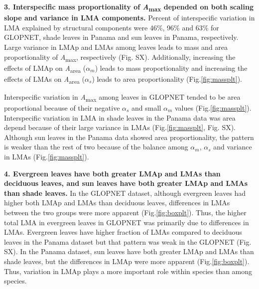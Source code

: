 \documentclass[
  12pt,
]{article}
\providecommand{\DIFaddtex}[1]{{\protect\color{blue}\uwave{#1}}} %
\providecommand{\DIFdeltex}[1]{{\protect\color{red}\sout{#1}}}                      %
\providecommand{\DIFaddbegin}{} %
\providecommand{\DIFaddend}{} %
\providecommand{\DIFdelbegin}{} %
\providecommand{\DIFdelend}{} %
\providecommand{\DIFadd}[1]{\texorpdfstring{\DIFaddtex{#1}}{#1}} %
\providecommand{\DIFdel}[1]{\texorpdfstring{\DIFdeltex{#1}}{}} %
\newcommand{\DIFscaledelfig}{0.5}
\newlength{\DIFdelgraphicswidth} %
\newlength{\DIFdelgraphicsheight} %
\newcommand{\DIFaddincludegraphics}[2][]{{\color{blue}\fbox{\DIFOincludegraphics[#1]{#2}}}} %
\newcommand{\DIFdelincludegraphics}[2][]{%
\sbox{\DIFdelgraphicsbox}{\DIFOincludegraphics[#1]{#2}}%
\settoboxwidth{\DIFdelgraphicswidth}{\DIFdelgraphicsbox} %
\settoboxtotalheight{\DIFdelgraphicsheight}{\DIFdelgraphicsbox} %
\scalebox{\DIFscaledelfig}{%
\parbox[b]{\DIFdelgraphicswidth}{\usebox{\DIFdelgraphicsbox}\\[-\baselineskip] \rule{\DIFdelgraphicswidth}{0em}}\llap{\resizebox{\DIFdelgraphicswidth}{\DIFdelgraphicsheight}{%
\setlength{\unitlength}{\DIFdelgraphicswidth}%
\begin{picture}(1,1)%
\thicklines\linethickness{2pt} %
{\color[rgb]{1,0,0}\put(0,0){\framebox(1,1){}}}%
{\color[rgb]{1,0,0}\put(0,0){\line( 1,1){1}}}%
{\color[rgb]{1,0,0}\put(0,1){\line(1,-1){1}}}%
\end{picture}%
}\hspace*{3pt}}} %
} %
\DeclareRobustCommand{\DIFaddbegin}{\DIFOaddbegin \let\includegraphics\DIFaddincludegraphics} %
\DeclareRobustCommand{\DIFaddend}{\DIFOaddend \let\includegraphics\DIFOincludegraphics} %
\DeclareRobustCommand{\DIFdelbegin}{\DIFOdelbegin \let\includegraphics\DIFdelincludegraphics} %
\DeclareRobustCommand{\DIFdelend}{\DIFOaddend \let\includegraphics\DIFOincludegraphics} %
\begin{document}
\textbf{3. Interspecific mass proportionality of \emph{A}\textsubscript{max} depended on both scaling slope and variance in LMA components.}
Percent of interspecific variation in LMA explained by structural components were 46\%, 96\% and 63\% for GLOPNET, shade leaves in Panama and sun leaves in Panama, respectively.
Large variance in LMAp and LMAs among leaves leads to mass and area proportionality of \emph{A}\textsubscript{max}, respectively (Fig. SX). Additionally, increasing the effects of LMAp on \emph{A}\textsubscript{area} (\DIFdelbegin \DIFdel{\(\alpha_m\)}\DIFdelend \DIFaddbegin \DIFadd{\(\alpha_p\)}\DIFaddend ) leads to mass proportionality and increasing the effects of LMAs on \emph{A}\textsubscript{area} (\(\alpha_s\)) leads to area proportionality (Fig.\DIFaddbegin \DIFadd{~}\DIFaddend \ref{fig:massplt}).

Interspecific variation in \emph{A}\textsubscript{max} among leaves in GLOPNET tended to be area proportional because of their negative \(\alpha_s\) and small \DIFdelbegin \DIFdel{\(\alpha_m\) }\DIFdelend \DIFaddbegin \DIFadd{\(\alpha_p\) }\DIFaddend values (Fig.\DIFaddbegin \DIFadd{~}\DIFaddend \ref{fig:massplt}).
Interspecific variation in LMA in shade leaves in the Panama data was area depend because of their large variance in LMAs (Fig.\DIFaddbegin \DIFadd{~}\DIFaddend \ref{fig:massplt}, Fig. SX).
Although sun leaves in the Panama data showed area proportionality, the
pattern is weaker than the rest of two because of the balance among \DIFdelbegin \DIFdel{\(\alpha_m\)}\DIFdelend \DIFaddbegin \DIFadd{\(\alpha_p\)}\DIFaddend , \(\alpha_s\) and variance in LMAs (Fig.\DIFaddbegin \DIFadd{~}\DIFaddend \ref{fig:massplt}).

\textbf{4. Evergreen leaves have both greater LMAp and LMAs than deciduous leaves, and sun leaves have both greater LMAp and LMAs than shade leaves.}
In the GLOPNET dataset, although evergreen leaves had higher both LMAp and LMAs than deciduous leaves, differences in LMAs between the two groups were more apparent (Fig.\DIFaddbegin \DIFadd{~}\DIFaddend \ref{fig:boxplt}).
Thus, the higher total LMA in evergreen leaves in GLOPNET was primarily due to differences in LMAs.
Evergreen leaves have higher fraction of LMAs compared to deciduous leaves in the Panama dataset but that pattern was weak in the GLOPNET (Fig. SX).
In the Panama dataset, sun leaves have both greater LMAp and LMAs than shade leaves, but the differences in LMAp were more apparent (Fig.\DIFaddbegin \DIFadd{~}\DIFaddend \ref{fig:boxplt}).
Thus, variation in LMAp plays a more important role within species than among species.
\end{document}
